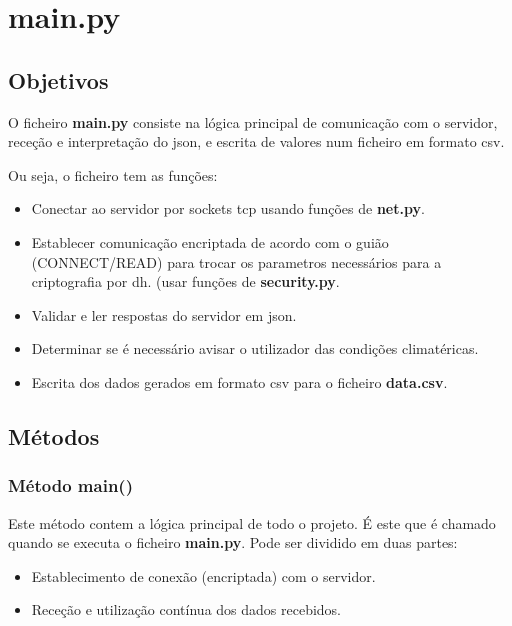 \documentclass{report}
\begin{document}

\section{main.py}

\subsection{Objetivos}
O ficheiro \textbf{main.py} consiste na lógica principal de comunicação com o servidor, receção e interpretação do \ac{json}, e escrita de valores num ficheiro em formato \ac{csv}.

Ou seja, o ficheiro tem as funções:
\begin{itemize}
	\item Conectar ao servidor por sockets \ac{tcp} usando funções de \textbf{net.py}.
	\item Establecer comunicação encriptada de acordo com o guião (CONNECT/READ) para trocar os parametros necessários para a criptografia por \ac{dh}. (usar funções de \textbf{security.py}.
	\item Validar e ler respostas do servidor em \ac{json}.
	\item Determinar se é necessário avisar o utilizador das condições climatéricas.
	\item Escrita dos dados gerados em formato \ac{csv} para o ficheiro \textbf{data.csv}.
\end{itemize}

\subsection{Métodos}

\subsubsection{Método main()}
Este método contem a lógica principal de todo o projeto.
É este que é chamado quando se executa o ficheiro \textbf{main.py}.
Pode ser dividido em duas partes:
\begin{itemize}
	\item Establecimento de conexão (encriptada) com o servidor.
	\item Receção e utilização contínua dos dados recebidos.
\end{itemize}
\end{document}
